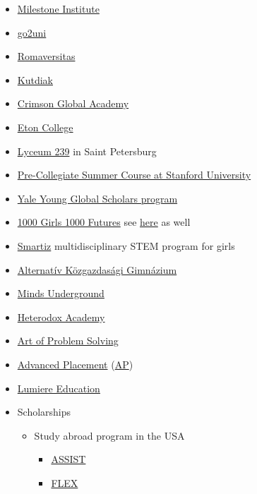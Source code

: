 \documentclass{article}
\begin{document}
\begin{itemize}
    \item \href{https://milestone-institute.org/}{Milestone Institute}
    \item \href{https://www.euroexam.org/go2uni}{go2uni}
    \item \href{https://romaversitas.hu/en/}{Romaversitas}
    \item \href{https://www.kutdiak.hu/en/}{Kutdiak}
    \item \href{https://www.crimsonglobalacademy.school/uk/}{Crimson Global Academy}
    \item \href{https://www.etoncollege.com/}{Eton College}
    \item \href{https://www.239.ru/}{Lyceum 239} in Saint Petersburg
    \item \href{https://summerinstitutes.spcs.stanford.edu/}{Pre-Collegiate Summer Course at Stanford University}
    \item \href{https://globalscholars.yale.edu/}{Yale Young Global Scholars program}
    \item \href{https://gsa.smapply.io/prog/student_programs_/}{1000 Girls 1000 Futures} see \href{https://pathwaystoscience.org/programhub.aspx?sort=HSC-NYAcadSci-JunAcad1000girls}{here} as well
    \item \href{https://nokatud.hu/smartiz/}{Smartiz} multidisciplinary STEM program for girls
    \item \href{https://www.akg.hu/}{Alternatív Közgazdasági Gimnázium}
    \item \href{https://www.mindsunderground.com/}{Minds Underground}
    \item \href{https://heterodoxacademy.org/}{Heterodox Academy}
    \item \href{https://artofproblemsolving.com/}{Art of Problem Solving}
    \item \href{https://en.wikipedia.org/wiki/Advanced_Placement}{Advanced Placement} (\href{https://apstudents.collegeboard.org/}{AP})
    \item \href{https://www.lumiere-education.com/}{Lumiere Education}
    
    \item Scholarships
    \begin{itemize}
        \item Study abroad program in the USA
        \begin{itemize}
            \item \href{https://www.assistscholars.org/en/index}{ASSIST}
            \item \href{https://www.discoverflex.org/}{FLEX}
        \end{itemize}
    \end{itemize}
\end{itemize}
\end{document}
